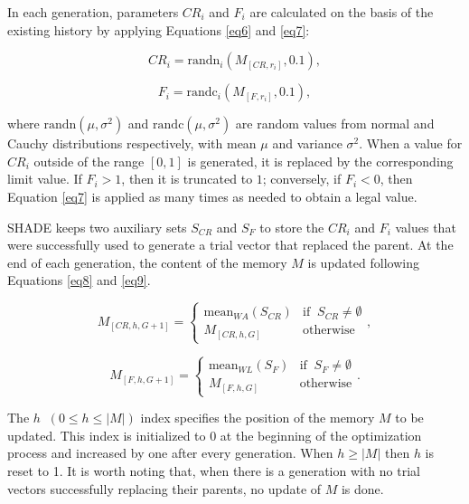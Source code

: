 \documentclass[review]{elsarticle}
\begin{document}
In each generation, parameters $CR_i$ and $F_i$ are calculated on the basis of the existing history by applying Equations \eqref{eq6} and \eqref{eq7}:

\begin{equation}
CR_i = \text{randn}_i(M_{[CR,r_i]}, 0.1),
\label{eq6}
\end{equation}

\begin{equation}
F_i = \text{randc}_i(M_{[F,r_i]}, 0.1),
\label{eq7}
\end{equation}

\noindent where $\text{randn}(\mu, \sigma^2)$ and $\text{randc}(\mu, \sigma^2)$ are random values from normal and Cauchy distributions respectively, with mean $\mu$ and variance $\sigma^2$. When a value for $CR_i$ outside of the range $[0,1]$ is generated, it is replaced by the corresponding limit value. If $F_i > 1$, then it is truncated to $1$; conversely, if $F_i < 0$, then Equation \eqref{eq7} is applied as many times as needed to obtain a legal value.

SHADE keeps two auxiliary sets $S_{CR}$ and $S_F$ to store the $CR_i$ and $F_i$ values that were successfully used to generate a trial vector that replaced the parent. At the end of each generation, the content of the memory $M$ is updated following Equations \eqref{eq8} and \eqref{eq9}.

\begin{equation}
M_{[CR,h,G+1]} = \left\{ \begin{array}{lc}
\text{mean}_{WA} (S_{CR}) & \text{if} \;\; S_{CR} \neq \emptyset \\
M_{[CR,h,G]} &  \text{otherwise}
\end{array}
\right.,
\label{eq8}
\end{equation}

\begin{equation}
M_{[F,h,G+1]} = \left\{ \begin{array}{lc}
\text{mean}_{WL} (S_{F}) & \text{if} \;\; S_{F} \neq \emptyset \\
M_{[F,h,G]} &  \text{otherwise}
\end{array}
\right..
\label{eq9}
\end{equation}

The $h \;\; (0 \le h \le |M|)$ index specifies the position of the memory $M$ to be updated. This index is initialized to $0$ at the beginning of the optimization process and increased by one after every generation. When $h \ge |M|$ then $h$ is reset to 1. It is worth noting that, when there is a generation with no trial vectors successfully replacing their parents, no update of $M$ is done.
\end{document}
